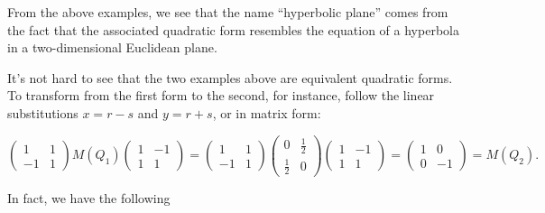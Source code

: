 \documentclass[12pt]{article}
\begin{document}
From the above examples, we see that the name ``hyperbolic plane''
comes from the fact that the associated quadratic form resembles the
equation of a hyperbola in a two-dimensional Euclidean plane.

It's not hard to see that the two examples above are equivalent
quadratic forms.  To transform from the first form to the second,
for instance, follow the linear substitutions $x=r-s$ and $y=r+s$,
or in matrix form:
\begin{center}$
\begin{pmatrix}
1 & 1 \\
-1 & 1
\end{pmatrix}
M(Q_1)
\begin{pmatrix}
1 & -1 \\
1 & 1
\end{pmatrix}
=
\begin{pmatrix}
1 & 1 \\
-1 & 1
\end{pmatrix}
\begin{pmatrix}
0 & \frac{1}{2} \\
\frac{1}{2} & 0
\end{pmatrix}
\begin{pmatrix}
1 & -1 \\
1 & 1
\end{pmatrix}
=\begin{pmatrix}
1 & 0 \\
0 & -1
\end{pmatrix}=
M(Q_2).$
\end{center}

In fact, we have the following
\end{document}
